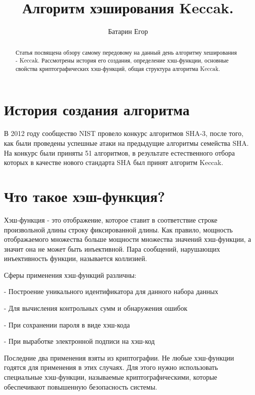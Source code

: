 \documentclass[a4paper,12pt]{article}
\author{Батарин Егор}
\title{Алгоритм хэширования Keccak.}
\date{}
\theoremstyle{plain} %
\theoremstyle{definition} %
\theoremstyle{remark} %
\begin{document}
	
	\maketitle
	
	\begin{abstract}
		
		Статья посвящена обзору самому передовому на данный день алгоритму хеширования - Keccak. Рассмотрены история его создания, определение хэш-функции, основные свойства криптографических хэш-функций, общая структура алгоритма Keccak.
		
	\end{abstract}
	
	\section{История создания алгоритма}
	
	В 2012 году сообщество NIST провело конкурс алгоритмов SHA-3, после того, как были проведены успешные атаки на предыдущие алгоритмы семейства SHA. На конкурс были приняты 51 алгоритмов, в результате естественного отбора которых в качестве нового стандарта SHA был принят алгоритм Keccak.
	
	\section{Что такое хэш-функция?}
	
	Хэш-функция - это отображение, которое ставит в соответствие строке произвольной длины строку фиксированной длины. Как правило, мощность отображаемого множества больше мощности множества значений хэш-функции, а значит она не может быть инъективной. Пара сообщений, нарушающих инъективность функции, называется коллизией.
	
	Сферы применения хэш-функций различны: 
	
	- Построение уникального идентификатора для данного набора данных
	
	- Для вычисления контрольных сумм и обнаружения ошибок
	
	- При сохранении пароля в виде хэш-кода
	
	- При выработке электронной подписи на хэш-код
	
	Последние два применения взяты из криптографии. Не любые хэш-функции годятся для применения в этих случаях. Для этого нужно использовать специальные хэш-функции, называемые криптографическими, которые обеспечивают повышенную безопасность системы.
	
\end{document}
